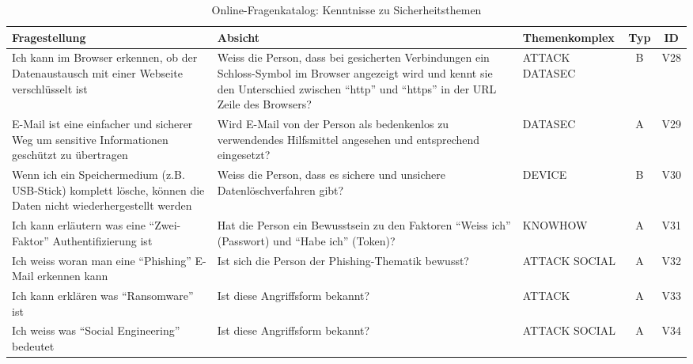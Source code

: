 \documentclass[../../main.tex]{subfiles}
\begin{document}

\sloppy 

\begin{table}[H]
\tablefontsize	
\centering
\caption{Online-Fragenkatalog: Kenntnisse zu Sicherheitsthemen}
\label{Kenntnisse zu Sicherheitsthemen}
\begin{tabular}{ |p{5.5cm}|p{5.5cm}|p{2.5cm}|c|c|}

\hline
\tableheaderbgcolor
\textbf{Fragestellung} & \textbf{Absicht} & \textbf{Themenkomplex} & \textbf{Typ} & \textbf{ID}\\ 
\hline

Ich kann im Browser erkennen, ob der Datenaustausch mit einer Webseite verschlüsselt ist & Weiss die Person, dass bei gesicherten Verbindungen ein Schloss-Symbol im Browser angezeigt wird und kennt sie  den Unterschied zwischen "`http"' und "`https"' in der URL Zeile des Browsers? & ATTACK \newline DATASEC & B & V28 \\
\hline

E-Mail ist eine einfacher und sicherer Weg um sensitive Informationen geschützt zu übertragen & Wird E-Mail von der Person als bedenkenlos zu verwendendes Hilfsmittel angesehen und entsprechend eingesetzt? & DATASEC & A & V29 \\
\hline

Wenn ich ein Speichermedium (z.B. USB-Stick) komplett lösche, können die Daten nicht wiederhergestellt werden & Weiss die Person, dass es sichere und unsichere Datenlöschverfahren gibt? & DEVICE & B & V30 \\
\hline

Ich kann erläutern was eine "`Zwei-Faktor"' Authentifizierung ist & Hat die Person ein Bewusstsein zu den Faktoren "`Weiss ich"' (Passwort) und "`Habe ich"' (Token)? & KNOWHOW & A & V31 \\
\hline

Ich weiss woran man eine "`Phishing"' E-Mail erkennen kann & Ist sich die Person der Phishing-Thematik bewusst? & ATTACK \newline SOCIAL & A & V32 \\
\hline

Ich kann erklären was "`Ransomware"' ist & Ist diese Angriffsform bekannt? & ATTACK & A & V33 \\
\hline

Ich weiss was "`Social Engineering"' bedeutet & Ist diese Angriffsform bekannt? & ATTACK \newline SOCIAL & A & V34 \\
\hline

\end{tabular}
\end{table}
\end{document}
